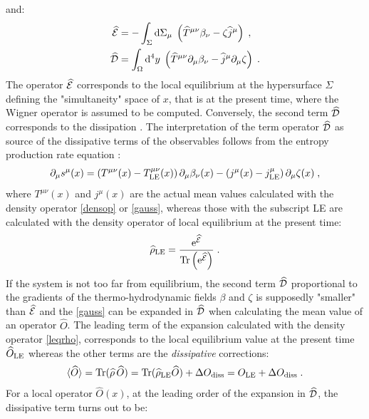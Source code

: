 \documentclass[prd,superscriptaddress,nofootinbib,notitlepage]{revtex4-1}
\def\wT{{\widehat T}}
\def\wj{{\widehat j}}
\def\wD{{\widehat{\cal D}}}
\def\wE{{\widehat{\cal E}}}
\def\wrho{{\widehat{\rho}}}
\def\wO{\widehat O}
\newcommand{\Tr}{{\rm Tr}}
\newcommand{\e}{{\rm e}}
\newcommand{\di}{{\rm d}}
\begin{document}
and:
%
\begin{subequations}\label{eandd}
    \begin{align}
\wE&=-\int_{\Sigma}\di\Sigma_\mu \; \left(\wT^{\mu\nu}\beta_\nu-\zeta \wj^\mu \right)\;,\\
\wD&=\int_\Omega\di^4 y \; \left(\wT^{\mu\nu} \partial_\mu\beta_\nu - \wj^\mu \partial_\mu\zeta 
\right)\;.
\end{align}
\end{subequations}
%
The operator $\wE$ corresponds to the local equilibrium at the hypersurface $\Sigma$ defining the "simultaneity" space of $x$, 
that is at the present time, where the Wigner operator is assumed to be computed. Conversely, the second term $\wD$ corresponds to the dissipation \cite{Becattini:2019dxo}. 
The interpretation of the term operator $\wD$ as source of the dissipative terms of the observables follows from the entropy
production rate equation \cite{VANWEERT1982133,Becattini:2019dxo}:
%
\begin{equation}\label{Entropy production}
    \partial_\mu s^\mu(x)= \left(T^{\mu\nu}(x)-T^{\mu\nu}_{\rm LE}(x)\right)\partial_\mu\beta_\nu(x)- 
    \left(j^\mu(x)-j^\mu_{\rm LE}\right) \partial_\mu\zeta(x)\;,
\end{equation}
%
where $T^{\mu\nu}(x)$ and $j^\mu(x)$ are the actual mean values calculated with the density operator \eqref{densop}
or \eqref{gauss}, whereas those with the subscript LE are calculated with the density operator of local equilibrium
at the present time:
%
\begin{equation}\label{leqrho}
   \wrho_{\rm LE} = \frac{\e^\wE}{\Tr\left( \e^\wE \right)}\;.  
\end{equation}
%
If the system is not too far from equilibrium, the second term $\wD$ proportional to the gradients of the thermo-hydrodynamic
fields $\beta$ and $\zeta$ is supposedly "smaller" than $\wE$ and the \eqref{gauss} can be expanded in $\wD$ when calculating
the mean value of an operator $\wO$. The leading term of the expansion calculated with the density operator \eqref{leqrho},
corresponds to the local equilibrium value at the present time $\wO_{\rm LE}$ whereas the other terms are the {\em dissipative} 
corrections:
%
\begin{equation}\label{leq+dis}
    \langle\wO\rangle = \Tr (\wrho \, \wO ) = \Tr (\wrho_{\rm LE} \wO) +
    \Delta O_{\rm diss} = O_{\rm LE} + \Delta O_{\rm diss}\;.
\end{equation}
%
For a local operator $\wO(x)$, at the leading order of the expansion in $\wD$, the dissipative term turns out to be:
\end{document}
